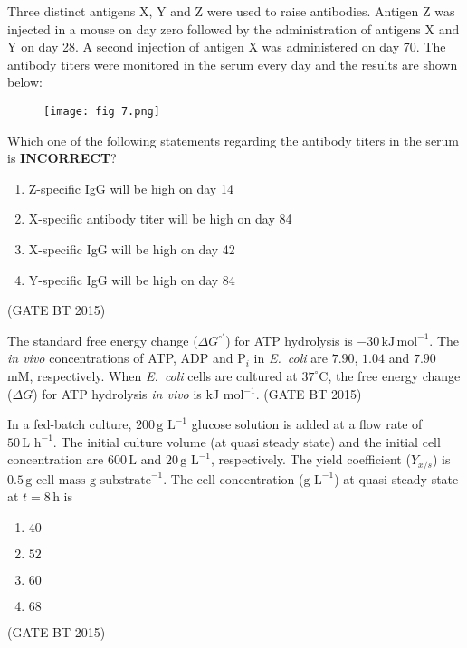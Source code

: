 \item Three distinct antigens X, Y and Z were used to raise antibodies. Antigen Z was injected in a mouse on day zero followed by the administration of antigens X and Y on day 28. A second injection of antigen X was administered on day 70. The antibody titers were monitored in the serum every day and the results are shown below:

\begin{figure}[H]
\centering
\texttt{[image: fig 7.png]}
\caption{}
\label{fig:antibody}
\end{figure}

Which one of the following statements regarding the antibody titers in the serum is \textbf{INCORRECT}?  


\begin{enumerate}
\item Z-specific IgG will be high on day 14  
\item X-specific antibody titer will be high on day 84  
\item X-specific IgG will be high on day 42  
\item Y-specific IgG will be high on day 84  
\end{enumerate}\hfill (GATE BT 2015)

\item The standard free energy change ($\Delta G^{\circ\prime}$) for ATP hydrolysis is $-30 \, \text{kJ}\,\text{mol}^{-1}$. 
The \textit{in vivo} concentrations of ATP, ADP and P$_i$ in \textit{E.~coli} are $7.90$, $1.04$ and $7.90$ mM, respectively. 
When \textit{E.~coli} cells are cultured at $37^{\circ} \mathrm{C}$, the free energy change ($\Delta G$) for ATP hydrolysis \textit{in vivo} is \underline{\hspace{2cm}} kJ mol$^{-1}$. 
\hfill (GATE BT 2015)


\item In a fed-batch culture, $200 \, \text{g L}^{-1}$ glucose solution is added at a flow rate of $50 \, \text{L h}^{-1}$. 
The initial culture volume (at quasi steady state) and the initial cell concentration are $600 \, \text{L}$ and $20 \, \text{g L}^{-1}$, respectively. 
The yield coefficient ($Y_{x/s}$) is $0.5 \, \text{g cell mass g substrate}^{-1}$.  
The cell concentration ($\text{g L}^{-1}$) at quasi steady state at $t = 8 \, \text{h}$ is  

\begin{multicols}{4}
\begin{enumerate}
\item $40$  
\item $52$  
\item $60$  
\item $68$  
\end{enumerate}
\end{multicols}\hfill (GATE BT 2015)


